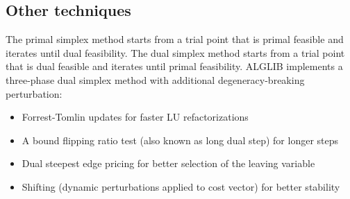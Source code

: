 \subsection{Other techniques}
The primal simplex method starts from a trial point that is primal feasible and iterates until dual feasibility.
The dual simplex method starts from a trial point that is dual feasible and iterates until primal feasibility.
ALGLIB implements a three-phase dual simplex method with additional degeneracy-breaking perturbation:
\begin{itemize}
    \item Forrest-Tomlin updates for faster LU refactorizations
    \item A bound flipping ratio test (also known as long dual step) for longer steps
    \item Dual steepest edge pricing for better selection of the leaving variable
    \item Shifting (dynamic perturbations applied to cost vector) for better stability
\end{itemize}
